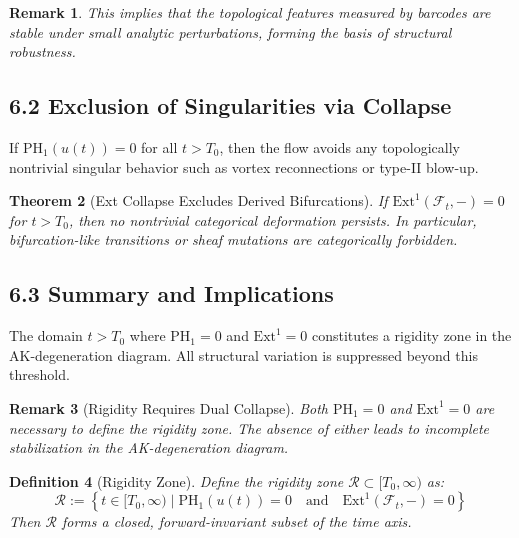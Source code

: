 \documentclass[11pt]{article}
\newtheorem{theorem}{Theorem}[section]
\newtheorem{definition}[theorem]{Definition}
\newtheorem{remark}[theorem]{Remark}
\begin{document}
\begin{remark}
This implies that the topological features measured by barcodes are stable under small analytic perturbations, forming the basis of structural robustness.
\end{remark}

\subsection{6.2 Exclusion of Singularities via Collapse}

\begin{proposition}
If $\mathrm{PH}_1(u(t)) = 0$ for all $t > T_0$, then the flow avoids any topologically nontrivial singular behavior such as vortex reconnections or type-II blow-up.
\end{proposition}

\begin{theorem}[Ext Collapse Excludes Derived Bifurcations]
If $\mathrm{Ext}^1(\mathcal{F}_t, -) = 0$ for $t > T_0$, then no nontrivial categorical deformation persists. In particular, bifurcation-like transitions or sheaf mutations are categorically forbidden.
\end{theorem}

\subsection{6.3 Summary and Implications}

\begin{corollary}
The domain $t > T_0$ where $\mathrm{PH}_1 = 0$ and $\mathrm{Ext}^1 = 0$ constitutes a rigidity zone in the AK-degeneration diagram. All structural variation is suppressed beyond this threshold.
\end{corollary}

\begin{remark}[Rigidity Requires Dual Collapse]
Both $\mathrm{PH}_1 = 0$ and $\mathrm{Ext}^1 = 0$ are necessary to define the rigidity zone. The absence of either leads to incomplete stabilization in the AK-degeneration diagram.
\end{remark}

\begin{definition}[Rigidity Zone]
Define the rigidity zone $\mathcal{R} \subset [T_0, \infty)$ as:
\[
\mathcal{R} := \left\{ t \in [T_0, \infty) \mid \mathrm{PH}_1(u(t)) = 0 \quad \text{and} \quad \mathrm{Ext}^1(\mathcal{F}_t, -) = 0 \right\}
\]
Then $\mathcal{R}$ forms a closed, forward-invariant subset of the time axis.
\end{definition}
\end{document}
